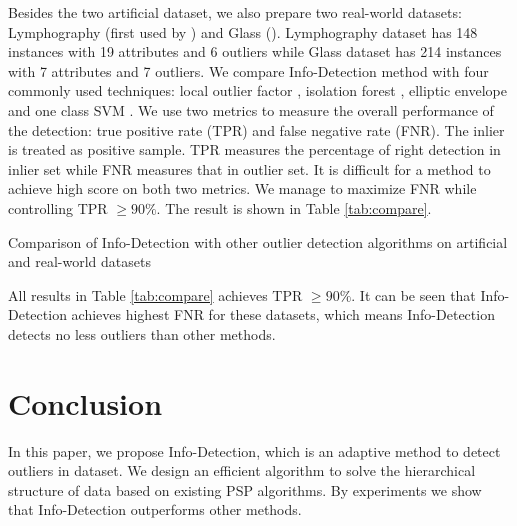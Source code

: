 \documentclass[runningheads]{llncs}
\begin{document}
Besides the two artificial dataset, we also prepare two real-world datasets: Lymphography (first used by \cite{Lazarevic}) and Glass (\cite{hics}). Lymphography dataset has 148 instances with 19 attributes and 6 outliers while Glass dataset has 214 instances with 7 attributes and 7 outliers. We compare Info-Detection method with four commonly used techniques: local outlier factor \cite{Breunig}, isolation forest \cite{if}, elliptic envelope \cite{rousseeuw1999fast} and one class SVM \cite{svm}. We use two metrics to measure the overall performance of the detection: true positive rate (TPR) and false negative rate (FNR). The inlier is treated as positive sample. TPR measures the percentage of right detection in inlier set while FNR measures that in outlier set. It is difficult for a method to achieve high score on both two metrics. We manage to maximize FNR while controlling TPR $\geq 90\%$. The result is shown in Table \ref{tab:compare}.
\begin{table}[!ht]
\centering
{}
\caption{Comparison of Info-Detection with other outlier detection algorithms on artificial and real-world datasets}\label{tab:compare}
\end{table}

All results in Table \ref{tab:compare} achieves TPR $\geq 90\%$. It can be seen that Info-Detection achieves highest FNR for these datasets, which means Info-Detection detects no less outliers than other methods.

\section{Conclusion}\label{sec:Conclusion}
In this paper, we propose Info-Detection, which is an adaptive method to detect outliers in dataset. We design an efficient algorithm to solve the hierarchical structure of data based on existing PSP algorithms. By experiments we show that Info-Detection outperforms other methods.  
%
%
%


%
\appendix
\end{document}
